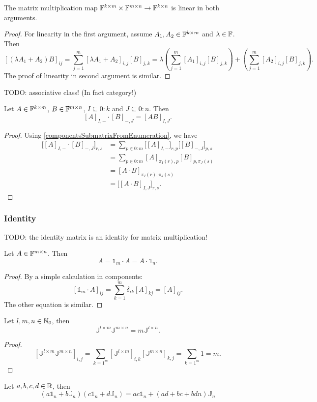 \begin{lemma} \label{linearityMatrixMultiplication}
The matrix multiplication map $\mathbb{F}^{k\times m}\times \mathbb{F}^{m\times n} \to \mathbb{F}^{k\times n}$ is linear in both arguments.
\end{lemma}
\begin{proof}
For linearity in the first argument, assume $A_1,A_2\in\mathbb{F}^{k\times m}$ and $\lambda\in \mathbb{F}$. Then
\[ [(\lambda A_1+ A_2)B]_{ij} = \sum_{j=1}^m[\lambda A_1+ A_2]_{i,j}[B]_{j,k} = \lambda \left(\sum_{j=1}^m[A_1]_{i,j}[B]_{j,k}\right) + \left(\sum_{j=1}^m[A_2]_{i,j}[B]_{j,k}\right). \]
The proof of linearity in second argument is similar.
\end{proof}

TODO: associative class! (In fact category!)

\begin{lemma} \label{submatrixMultiplication}
Let $A\in \mathbb{F}^{k\times m}$, $B\in \mathbb{F}^{m\times n}$, $I\subseteq 0:k$ and $J\subseteq 0:n$. Then
\[ [A]_{I,-}\cdot [B]_{-,J} = [AB]_{I,J}. \]
\end{lemma}
\begin{proof}
Using \ref{componentsSubmatrixFromEnumeration}, we have
\begin{align*}
\big[[A]_{I,-}\cdot [B]_{-,J}\big]_{r,s} &= \sum_{p\in 0:m}\big[[A]_{I,-}\big]_{r, p} \big[[B]_{-,J}\big]_{p,s} \\
&= \sum_{p\in 0:m}[A]_{\pi_I(r), p}[B]_{p, \pi_J(s)} \\
&= [A\cdot B]_{\pi_I(r), \pi_J(s)} \\
&= \big[[A\cdot B]_{I,J}\big]_{r,s}.
\end{align*}
\end{proof}

\subsubsection{Identity}
TODO: the identity matrix is an identity for matrix multiplication!


\begin{lemma}
Let $A\in\mathbb{F}^{m\times n}$. Then
\[ A = \mathbb{1}_m\cdot A = A \cdot \mathbb{1}_n. \]
\end{lemma}
\begin{proof}
By a simple calculation in components:
\[ [\mathbb{1}_m\cdot A]_{ij} = \sum_{k=1}^m\delta_{ik}[A]_{kj} = [A]_{ij}. \]
The other equation is similar.
\end{proof}

\begin{lemma} \label{matrixOfOnesMultiplication}
Let $l,m,n\in\mathbb{N}_0$, then
\[ \mathbb{J}^{l\times m}\mathbb{J}^{m\times n} = m\mathbb{J}^{l\times n}. \]
\end{lemma}
\begin{proof}
\[ [\mathbb{J}^{l\times m}\mathbb{J}^{m\times n}]_{i,j} = \sum_{k=1^m}[\mathbb{J}^{l\times m}]_{i,k}[\mathbb{J}^{m\times n}]_{k,j} = \sum_{k=1^m}1 = m. \]
\end{proof}
\begin{corollary}
Let $a,b,c,d\in\mathbb{R}$, then
\[ (a\mathbb{1}_n + b\mathbb{J}_n)(c\mathbb{1}_n + d\mathbb{J}_n) = ac\mathbb{1}_n + (ad+bc +bdn)\mathbb{J}_n \]
\end{corollary}

